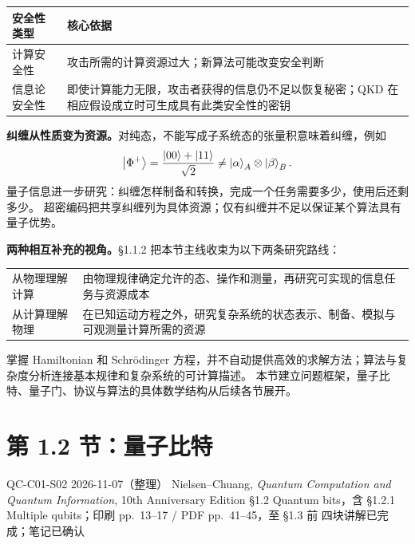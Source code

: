 \begin{center}
\begin{tabularx}{\textwidth}{@{}lX@{}}
\toprule
安全性类型 & 核心依据 \\
\midrule
计算安全性 & 攻击所需的计算资源过大；新算法可能改变安全判断 \\
信息论安全性 & 即使计算能力无限，攻击者获得的信息仍不足以恢复秘密；QKD 在相应假设成立时可生成具有此类安全性的密钥 \\
\bottomrule
\end{tabularx}
\end{center}

\textbf{纠缠从性质变为资源。}对纯态，不能写成子系统态的张量积意味着纠缠，例如
\begin{equation*}
  \left|\Phi^+\right\rangle=\frac{\left|00\right\rangle+\left|11\right\rangle}{\sqrt2}
  \ne\left|\alpha\right\rangle_A\otimes\left|\beta\right\rangle_B.
\end{equation*}
量子信息进一步研究：纠缠怎样制备和转换，完成一个任务需要多少，使用后还剩多少。
超密编码把共享纠缠列为具体资源；仅有纠缠并不足以保证某个算法具有量子优势。

\textbf{两种相互补充的视角。}\S 1.1.2 把本节主线收束为以下两条研究路线：
\begin{center}
\begin{tabularx}{\textwidth}{@{}lX@{}}
\toprule
从物理理解计算 & 由物理规律确定允许的态、操作和测量，再研究可实现的信息任务与资源成本 \\
从计算理解物理 & 在已知运动方程之外，研究复杂系统的状态表示、制备、模拟与可观测量计算所需的资源 \\
\bottomrule
\end{tabularx}
\end{center}
掌握 Hamiltonian 和 Schrödinger 方程，并不自动提供高效的求解方法；算法与复杂度分析连接基本规律和复杂系统的可计算描述。
本节建立问题框架，量子比特、量子门、协议与算法的具体数学结构从后续各节展开。

\section{第 1.2 节：量子比特}
\label{section:QC-C01-S02}
\studymeta
  {QC-C01-S02}
  {2026-11-07（整理）}
  {Nielsen--Chuang, \textit{Quantum Computation and Quantum Information}, 10th Anniversary Edition}
  {\S 1.2 Quantum bits，含 \S 1.2.1 Multiple qubits；印刷 pp.~13--17 / PDF pp.~41--45，至 \S 1.3 前}
  {四块讲解已完成；笔记已确认}


